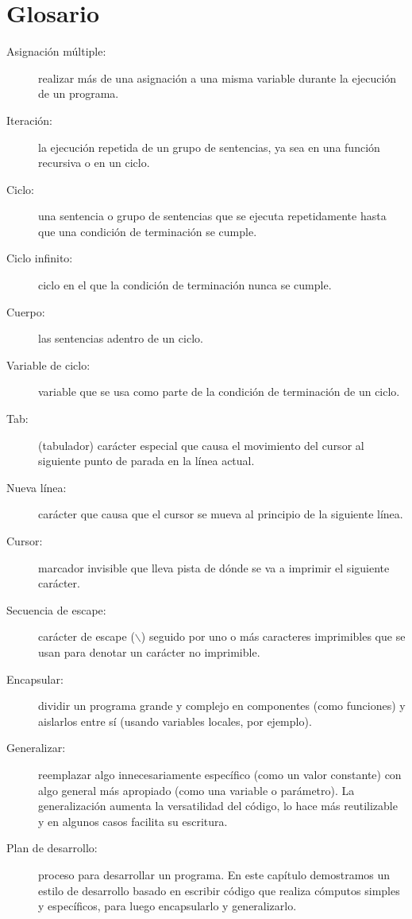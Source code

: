 \section{Glosario}
\begin{description}
\item [{Asignación múltiple:}] realizar más de una asignación a una
misma variable durante la ejecución de un programa.
\item [{Iteración:}] la ejecución repetida de un grupo de sentencias, ya
sea en una función recursiva o en un ciclo.
\item [{Ciclo:}] una sentencia o grupo de sentencias que se ejecuta repetidamente
hasta que una condición de terminación se cumple.
\item [{Ciclo infinito:}] ciclo en el que la condición de terminación
nunca se cumple.
\item [{Cuerpo:}] las sentencias adentro de un ciclo.
\item [{Variable de ciclo:}] variable que se usa como parte de la condición
de terminación de un ciclo.
\item [{Tab:}] (tabulador) carácter especial que causa el movimiento del
cursor al siguiente punto de parada en la línea actual.
\item [{Nueva línea:}] carácter que causa que el cursor se mueva al principio
de la siguiente línea.
\item [{Cursor:}] marcador invisible que lleva pista de dónde se va a imprimir
el siguiente carácter.
\item [{Secuencia de escape:}] carácter de escape ($\backslash$) seguido
por uno o más caracteres imprimibles que se usan para denotar un carácter
no imprimible.
\item [{Encapsular:}] dividir un programa grande y complejo en componentes
(como funciones) y aislarlos entre sí (usando variables locales, por
ejemplo).
\item [{Generalizar:}] reemplazar algo innecesariamente específico (como
un valor constante) con algo general más apropiado (como una variable
o parámetro). La generalización aumenta la versatilidad del código,
lo hace más reutilizable y en algunos casos facilita su escritura.
\item [{Plan de desarrollo:}] proceso para desarrollar un programa. En
este capítulo demostramos un estilo de desarrollo basado en escribir
código que realiza cómputos simples y específicos, para luego encapsularlo
y generalizarlo.

  
   
   
  
\end{description}

